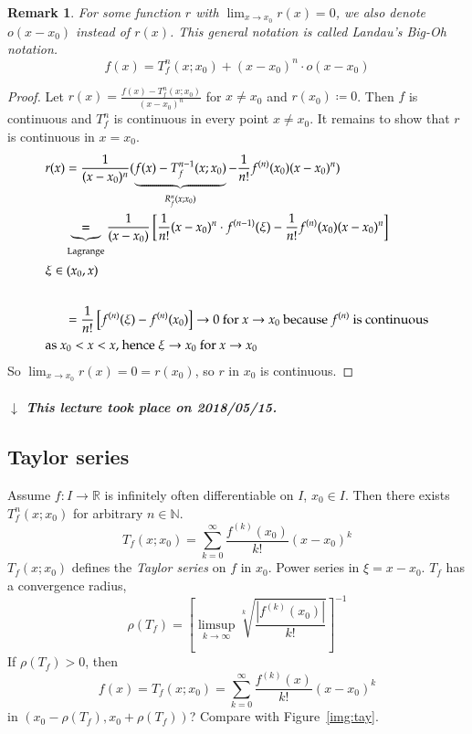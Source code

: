 \documentclass{article}
\newtheorem{remark}{Remark}  \numberwithin{remark}{section}
\newcommand{\card}[1]{\left|#1\right|}
\newcommand{\dateref}[1]{%
  \begin{mdframed}[backgroundcolor=gray!10,innerbottommargin=0pt,innertopmargin=0pt]
    \paragraph{\textit{$\downarrow$ This lecture took place on #1.}}%
  \end{mdframed}%
}
\begin{document}
\begin{remark}
  For some function $r$ with $\lim_{x\to x_0} r(x) = 0$, we also denote $o(x - x_0)$ instead of $r(x)$.
  This general notation is called Landau's Big-Oh notation.
  \[ f(x) = T_f^n(x; x_0) + (x - x_0)^n \cdot o(x - x_0) \]
\end{remark}

\begin{proof}
  Let $r(x) = \frac{f(x) - T_f^n(x; x_0)}{(x - x_0)^n}$ for $x \neq x_0$ and $r(x_0) \coloneqq 0$.
  Then $f$ is continuous and $T_f^n$ is continuous in every point $x \neq x_0$.
  It remains to show that $r$ is continuous in $x = x_0$.
  \begin{align*}
    r(x) &= \frac{1}{(x - x_0)^n} (\underbrace{f(x) - T_f^{n-1}(x; x_0)}_{R_f^n(x; x_0)} - \frac1{n!} f^{(n)}(x_0)(x - x_0)^n) \\
      &\underbrace{=}_{\text{Lagrange}} \frac{1}{(x - x_0)} \left[ \frac{1}{n!} (x - x_0)^n \cdot f^{(n-1)}(\xi) - \frac{1}{n!} f^{(n)}(x_0)(x - x_0)^n \right] \\
    \intertext{$\xi \in (x_0, x)$} \\
      &= \frac{1}{n!} \left[f^{(n)}(\xi) - f^{(n)}(x_0)\right] \to 0 \text{ for } x \to x_0 \text{ because } f^{(n)} \text{ is continuous} \\
    \intertext{as $x_0 < x < x$, hence $\xi \to x_0$ for $x \to x_0$} 
  \end{align*}
  So $\lim_{x\to x_0} r(x) = 0 = r(x_0)$, so $r$ in $x_0$ is continuous.
\end{proof}

\dateref{2018/05/15}

\subsection{Taylor series}

Assume $f: I \to \mathbb R$ is infinitely often differentiable on $I$, $x_0 \in I$. Then there exists $T_f^n(x; x_0)$ for arbitrary $n \in \mathbb N$.
\[ T_f(x; x_0) = \sum_{k=0}^\infty \frac{f^{(k)}(x_0)}{k!} (x - x_0)^k \]
$T_f(x; x_0)$ defines the \emph{Taylor series} on $f$ in $x_0$.
Power series in $\xi = x - x_0$.
$T_f$ has a convergence radius,
\[ \rho(T_f) = \left[\limsup_{k\to\infty} \sqrt[k]{\frac{\card{f^{(k)}(x_0)}}{k!}}\right]^{-1} \]
If $\rho(T_f) > 0$, then
\[ f(x) = T_f(x; x_0) = \sum_{k=0}^\infty \frac{f^{(k)}(x)}{k!} (x - x_0)^k \]
in $(x_0 - \rho(T_f), x_0 + \rho(T_f))$?
Compare with Figure~\ref{img:tay}.
\end{document}
